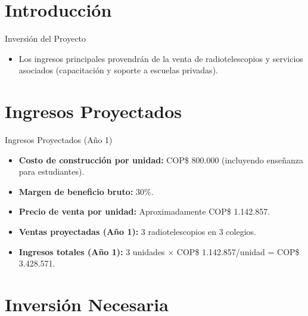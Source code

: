 \section{Introducción}

\begin{frame}{Inversión del Proyecto}
    \begin{itemize}
        \item Los ingresos principales provendrán de la venta de 
            radiotelescopios y servicios asociados (capacitación y soporte a 
            escuelas privadas).
    \end{itemize}
\end{frame}

\section{Ingresos Proyectados}

\begin{frame}{Ingresos Proyectados (Año 1)}
    \begin{itemize}
        \item \textbf{Costo de construcción por unidad:} COP\$ 800.000 
            (incluyendo enseñanza para estudiantes).
        \item \textbf{Margen de beneficio bruto:} 30\%.
        \item \textbf{Precio de venta por unidad:} Aproximadamente COP\$ 1.142.857.
        \item \textbf{Ventas proyectadas (Año 1):} 3 radiotelescopios en 3 colegios.
        \item \textbf{Ingresos totales (Año 1):} 3 unidades $\times$ 
            COP\$ 1.142.857/unidad = COP\$ 3.428.571.
    \end{itemize}
\end{frame}

\section{Inversión Necesaria}

